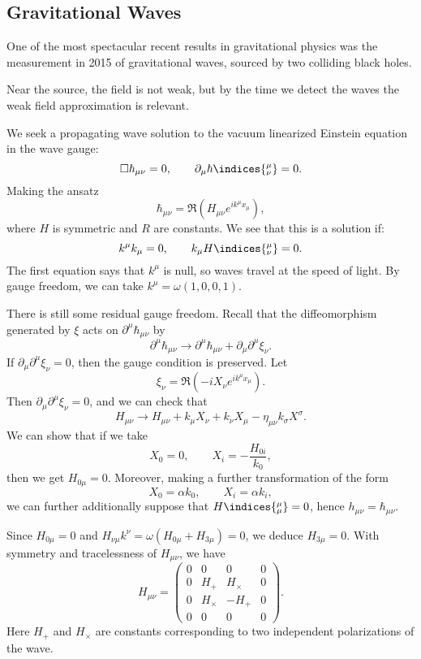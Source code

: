 \documentclass[12pt]{article}
\begin{document}
\subsection{Gravitational Waves}%
\label{sub:gws}

One of the most spectacular recent results in gravitational physics was the measurement in 2015 of gravitational waves, sourced by two colliding black holes.

Near the source, the field is not weak, but by the time we detect the waves the weak field approximation is relevant.


We seek a propagating wave solution to the vacuum linearized Einstein equation in the wave gauge:
\[
\square \hbar_{\mu\nu} = 0, \qquad \partial_\mu \hbar\indices{^{\mu}_{\nu}}= 0.
\]
Making the ansatz
\[
\hbar_{\mu\nu} = \Re \left( H_{\mu\nu} e^{ik^\mu x_\mu} \right),
\]
where $H$ is symmetric and $R$ are constants. We see that this is a solution if:
\[
	k^\mu k_\mu = 0, \qquad k_\mu H\indices{^{\mu}_{\nu}} = 0.
\]
The first equation says that $k^\mu$ is null, so waves travel at the speed of light. By gauge freedom, we can take $k^\mu = \omega(1, 0, 0, 1)$.

There is still some residual gauge freedom. Recall that the diffeomorphism generated by $\xi$ acts on $\partial^\mu \hbar_{\mu\nu}$ by
\[
\partial^{\mu} \hbar_{\mu\nu} \to \partial^{\mu} \hbar_{\mu\nu} + \partial_\mu \partial^\mu \xi_\nu.
\]
If $\partial_\mu \partial^{\mu} \xi_\nu = 0$, then the gauge condition is preserved. Let
\[
\xi_\nu = \Re (-i X_\nu e^{ik ^\mu x_\mu} ).
\]
Then $\partial_\mu \partial^\mu \xi_\nu = 0$, and we can check that
\[
H_{\mu\nu} \to H_{\mu\nu} + k_\mu X_\nu  + k_\nu X_\mu - \eta_{\mu\nu} k_\sigma X^\sigma.
\]
We can show that if we take
\[
X_0 = 0, \qquad X_i = - \frac{H_{0i}}{k_0},
\]
then we get $H_{0\mu} = 0$. Moreover, making a further transformation of the form
\[
X_0 = \alpha k_0, \qquad X_i = \alpha k_i,
\]
we can further additionally suppose that $H\indices{_{\mu}^\mu} = 0$, hence $h_{\mu\nu} = \hbar_{\mu\nu}$.

Since $H_{0\mu} = 0$ and $H_{\nu\mu} k^\nu = \omega(H_{0\mu} + H_{3\mu}) = 0$, we deduce $H_{3\mu} = 0$. With symmetry and tracelessness of $H_{\mu\nu}$, we have
\[
H_{\mu\nu} =
\begin{pmatrix}
	0 & 0 & 0 & 0 \\
	0 & H_+ & H_\times & 0 \\
	0 & H_\times & -H_+ & 0 \\
	0 & 0 & 0 & 0
\end{pmatrix}.
\]
Here $H_+$ and $H_\times$ are constants corresponding to two independent polarizations of the wave.
\end{document}
